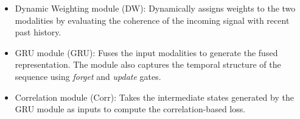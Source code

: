 \documentclass[10pt,twocolumn,letterpaper]{article}
\begin{document}
\begin{itemize}
	\item Dynamic Weighting module (DW): Dynamically assigns weights to the two modalities by evaluating the coherence of the incoming signal with recent past history. %
%
%
%
%
%
%
%
%
%
% 
% 
% 
% 
% 
% 
    \item GRU module (GRU): Fuses the input modalities to generate the fused representation. The module also captures the temporal structure of the sequence using \textit{forget} and \textit{update} gates.   
	\item Correlation module (Corr): Takes the intermediate states generated by the GRU module as inputs to compute the correlation-based loss. %
\end{itemize}
\end{document}
